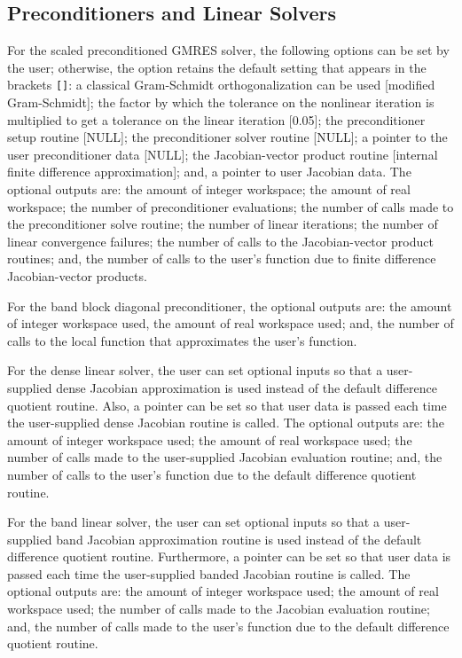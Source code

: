 \subsection{Preconditioners and Linear Solvers}
\label{ss:linear_usage}

For the scaled preconditioned GMRES solver, the following options can
be set by the user; otherwise, the option retains the default setting
that appears in the brackets {\tt []}:
a classical Gram-Schmidt orthogonalization can be used [modified Gram-Schmidt];
the factor by which the tolerance on the
nonlinear iteration is multiplied to get a tolerance on the linear
iteration [0.05]; the preconditioner setup routine [NULL]; the
preconditioner solver routine [NULL]; a pointer to the user
preconditioner data [NULL]; the Jacobian-vector product routine
[internal finite difference approximation]; and, a pointer to user
Jacobian data. The optional outputs are: the amount of integer
workspace; the amount of real workspace; the number of preconditioner
evaluations; the number of calls made to the preconditioner solve
routine; the number of linear iterations; the number of linear
convergence failures; the number of calls to the Jacobian-vector
product routines; and, the number of calls to the user's function due
to finite difference Jacobian-vector products.

For the band block diagonal preconditioner, the optional outputs are:
the amount of integer workspace used, the amount of real workspace
used; and, the number of calls to the local function that approximates
the user's function.

For the dense linear solver, the user can set optional inputs so that a
user-supplied dense Jacobian approximation is used instead of the
default difference quotient routine. Also, a pointer can be set so
that user data is passed each time the user-supplied dense Jacobian
routine is called. The optional outputs are: the amount of integer
workspace used; the amount of real workspace used; the number of calls
made to the user-supplied Jacobian evaluation routine; and, the number
of calls to the user's function due to the default difference quotient
routine.

For the band linear solver, the user can set optional inputs so that a
user-supplied band Jacobian approximation routine is used instead of
the default difference quotient routine. Furthermore, a pointer can be
set so that user data is passed each time the user-supplied banded
Jacobian routine is called. The optional outputs are: the amount
of integer workspace used; the amount of real workspace used; the
number of calls made to the Jacobian evaluation routine; and, the
number of calls made to the user's function due to the default
difference quotient routine.

